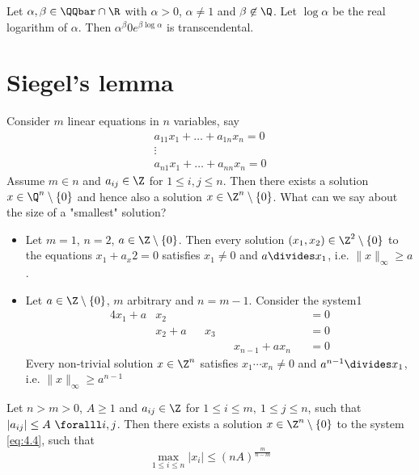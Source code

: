\begin{thmn}
	Let \( \alpha, \beta \in \QQbar \cap \R \) with \( \alpha > 0 \), \( \alpha \neq 1 \) and \( \beta \not\in \Q \).
	Let \( \log\alpha \) be the real logarithm of \( \alpha \).
	Then \( \alpha^\beta 0 e^{\beta \log\alpha} \) is transcendental.
\end{thmn}


\section{Siegel's lemma}

Consider \( m \) linear equations in \( n \) variables, say
\begin{equation}\label{eq:4.4}
	\begin{array}{c}
		a_{11} x_1 + \dots + a_{1n}x_n = 0\\
		\vdots \\
		a_{n1}x_1 + \dots + a_{nn}x_n = 0
	\end{array}
\end{equation}
Assume \( m \in n \) and \( a_{ij} \in \Z \) for \( 1 \leq i,j \leq n \).
Then there exists a solution \( x \in \Q^n \setminus \{0\} \) and hence also a solution \( x \in \Z^n \setminus \{0\} \).
What can we say about the size of a "smallest" solution?

\begin{exmp*}
	\begin{itemize}
		\item Let \( m=1 \), \( n=2 \), \( a \in \Z \setminus \{0\} \).
			Then every solution \( (x_1,x_2) \in \Z^2 \setminus \{0\} \) to  the equations \( x_1 + a_x2 = 0 \) satisfies \( x_1 \neq 0 \) and \( a \divides x_1 \), i.e. \( \|x\|_\infty \geq a \).
		\item Let \( a \in \Z \setminus \{0\} \), \( m \) arbitrary and \( n = m-1 \).
			Consider the system1
			\begin{alignat*}{4}
				x_1 + a &x_2 && && &&= 0\\
				&x_2 + a &&x_3 && &&= 0\\
				& && &&x_{n-1} + ax_n &&= 0
			\end{alignat*}
			Every non-trivial solution \( x \in \Z^n \) satisfies \( x_1 \dotsm x_n \neq 0 \) and \( a^{n-1} \divides x_1 \), i.e. \( \|x\|_\infty \geq a^{n-1} \)
	\end{itemize}
\end{exmp*}

\begin{thm}\label{thm:4.34} 
	Let \( n > m > 0 \), \( A \geq 1 \) and \( a_{ij} \in \Z \) for \( 1 \leq i \leq m,\ 1 \leq j \leq n \), such that \( |a_{ij}| \leq A \ \foralll i,j \).
	Then there exists a solution \( x \in \Z^n \setminus \{0\} \) to the system \eqref{eq:4.4}, such that
	\[ \max_{1 \leq i \leq n} |x_i| \leq (nA)^\frac{m}{n-m} \]
\end{thm}

